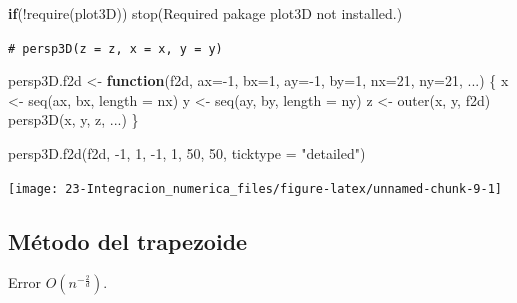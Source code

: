 \documentclass[
  10pt,
]{book}
\newenvironment{Shaded}{\begin{snugshade}}{\end{snugshade}}
\newcommand{\AttributeTok}[1]{\textcolor[rgb]{0.77,0.63,0.00}{#1}}
\newcommand{\CommentTok}[1]{\textcolor[rgb]{0.56,0.35,0.01}{\textit{#1}}}
\newcommand{\ControlFlowTok}[1]{\textcolor[rgb]{0.13,0.29,0.53}{\textbf{#1}}}
\newcommand{\DecValTok}[1]{\textcolor[rgb]{0.00,0.00,0.81}{#1}}
\newcommand{\FunctionTok}[1]{\textcolor[rgb]{0.00,0.00,0.00}{#1}}
\newcommand{\NormalTok}[1]{#1}
\newcommand{\OtherTok}[1]{\textcolor[rgb]{0.56,0.35,0.01}{#1}}
\newcommand{\SpecialCharTok}[1]{\textcolor[rgb]{0.00,0.00,0.00}{#1}}
\newcommand{\StringTok}[1]{\textcolor[rgb]{0.31,0.60,0.02}{#1}}
\theoremstyle{break}
\theoremstyle{nonumberplain}
\renewcommand{\CommentTok}[1]{\textcolor[rgb]{0.41,0.41,0.41}{\texttt{#1}}}
\begin{document}
\begin{Shaded}
\begin{Highlighting}[]
\ControlFlowTok{if}\NormalTok{(}\SpecialCharTok{!}\FunctionTok{require}\NormalTok{(plot3D)) }\FunctionTok{stop}\NormalTok{(}\StringTok{\textquotesingle{}Required pakage \textasciigrave{}plot3D\textasciigrave{} not installed.\textquotesingle{}}\NormalTok{)}

\CommentTok{\# persp3D(z = z, x = x, y = y)}

\NormalTok{persp3D.f2d }\OtherTok{\textless{}{-}} \ControlFlowTok{function}\NormalTok{(f2d, }\AttributeTok{ax=}\SpecialCharTok{{-}}\DecValTok{1}\NormalTok{, }\AttributeTok{bx=}\DecValTok{1}\NormalTok{, }\AttributeTok{ay=}\SpecialCharTok{{-}}\DecValTok{1}\NormalTok{, }\AttributeTok{by=}\DecValTok{1}\NormalTok{, }\AttributeTok{nx=}\DecValTok{21}\NormalTok{, }\AttributeTok{ny=}\DecValTok{21}\NormalTok{, ...) \{ }
\NormalTok{  x }\OtherTok{\textless{}{-}} \FunctionTok{seq}\NormalTok{(ax, bx, }\AttributeTok{length =}\NormalTok{ nx)}
\NormalTok{  y }\OtherTok{\textless{}{-}} \FunctionTok{seq}\NormalTok{(ay, by, }\AttributeTok{length =}\NormalTok{ ny)}
\NormalTok{  z }\OtherTok{\textless{}{-}} \FunctionTok{outer}\NormalTok{(x, y, f2d)}
  \FunctionTok{persp3D}\NormalTok{(x, y, z, ...)}
\NormalTok{\}}

\FunctionTok{persp3D.f2d}\NormalTok{(f2d, }\SpecialCharTok{{-}}\DecValTok{1}\NormalTok{, }\DecValTok{1}\NormalTok{, }\SpecialCharTok{{-}}\DecValTok{1}\NormalTok{, }\DecValTok{1}\NormalTok{, }\DecValTok{50}\NormalTok{, }\DecValTok{50}\NormalTok{, }\AttributeTok{ticktype =} \StringTok{"detailed"}\NormalTok{) }
\end{Highlighting}
\end{Shaded}

\begin{center}\texttt{[image: 23-Integracion\_numerica\_files/figure-latex/unnamed-chunk-9-1]} \end{center}

\hypertarget{muxe9todo-del-trapezoide-1}{%
\subsection{Método del trapezoide}\label{muxe9todo-del-trapezoide-1}}

Error \(O(n^{-\frac{2}{d}})\).
\end{document}
